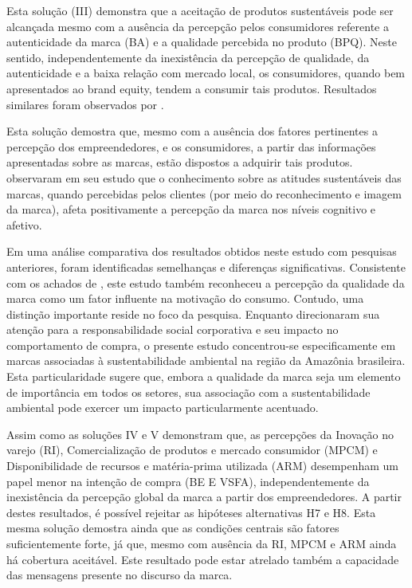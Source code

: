 Esta solução (III) demonstra que a aceitação de produtos sustentáveis pode ser alcançada mesmo com a ausência da percepção pelos consumidores referente a autenticidade da marca (BA) e a qualidade percebida no produto (BPQ). Neste sentido, independentemente da inexistência da percepção de qualidade, da autenticidade e a baixa relação com mercado local, os consumidores, quando bem apresentados ao brand equity, tendem a consumir tais produtos. Resultados similares foram observados por . 

Esta solução demostra que, mesmo com a ausência dos fatores pertinentes a percepção dos empreendedores, e os consumidores, a partir das informações apresentadas sobre as marcas, estão dispostos a adquirir tais produtos.   observaram em seu estudo que o conhecimento sobre as atitudes sustentáveis das marcas, quando percebidas pelos clientes (por meio do reconhecimento e imagem da marca), afeta positivamente a percepção da marca nos níveis cognitivo e afetivo. 

Em uma análise comparativa dos resultados obtidos neste estudo com pesquisas anteriores, foram identificadas semelhanças e diferenças significativas. Consistente com os achados de , este estudo também reconheceu a percepção da qualidade da marca como um fator influente na motivação do consumo. Contudo, uma distinção importante reside no foco da pesquisa. Enquanto  direcionaram sua atenção para a responsabilidade social corporativa e seu impacto no comportamento de compra, o presente estudo concentrou-se especificamente em marcas associadas à sustentabilidade ambiental na região da Amazônia brasileira. Esta particularidade sugere que, embora a qualidade da marca seja um elemento de importância em todos os setores, sua associação com a sustentabilidade ambiental pode exercer um impacto particularmente acentuado.

Assim como as soluções IV e V demonstram que, as percepções da Inovação no varejo (RI), Comercialização de produtos e mercado consumidor (MPCM) e Disponibilidade de recursos e matéria-prima utilizada (ARM) desempenham um papel menor na intenção de compra (BE E VSFA), independentemente da inexistência da percepção global da marca a partir dos empreendedores. A partir destes resultados, é possível rejeitar as hipóteses alternativas H7 e H8. Esta mesma solução demostra ainda que as condições centrais são fatores suficientemente forte, já que, mesmo com ausência da RI, MPCM e ARM ainda há cobertura aceitável. Este resultado pode estar atrelado também a capacidade das mensagens presente no discurso da marca. 

